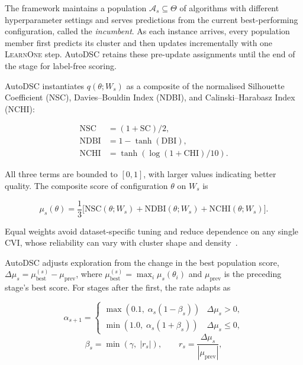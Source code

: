 \documentclass[conference]{IEEEtran}
\begin{document}
The framework maintains a population $\mathcal{A}_s \subseteq \Theta$ of algorithms with different hyperparameter settings and serves predictions from the current best-performing configuration, called the \textit{incumbent}. As each instance arrives, every population member first predicts its cluster and then updates incrementally with one \textsc{LearnOne} step. AutoDSC retains these pre-update assignments until the end of the stage for label-free scoring.

AutoDSC instantiates $q(\theta;W_s)$ as a composite of the normalised Silhouette Coefficient (NSC), Davies--Bouldin Index (NDBI), and Calinski--Harabasz Index (NCHI):

\begin{equation}
\begin{aligned}
\text{NSC} &= (1+\text{SC})/2, \\
\text{NDBI} &= 1-\tanh(\text{DBI}), \\
\text{NCHI} &= \tanh\!\left(\log(1+\text{CHI})/10\right).
\end{aligned}
\label{eq:normalisation}
\end{equation}

All three terms are bounded to $[0,1]$, with larger values indicating better quality. The composite score of configuration $\theta$ on $W_s$ is

\begin{equation}
\label{eq:score}
\mu_s(\theta) = \frac{1}{3}\bigl[\text{NSC}(\theta;W_s) + \text{NDBI}(\theta;W_s) + \text{NCHI}(\theta;W_s)\bigr].
\end{equation}

Equal weights avoid dataset-specific tuning and reduce dependence on any single CVI, whose reliability can vary with cluster shape and density~\cite{arbelaitz2013extensive,liu2010understanding}.

AutoDSC adjusts exploration from the change in the best population score, $\Delta\mu_s=\mu_{\text{best}}^{(s)}-\mu_{\text{prev}}$, where $\mu_{\text{best}}^{(s)}=\max_i\mu_s(\theta_i)$ and $\mu_{\text{prev}}$ is the preceding stage's best score. For stages after the first, the rate adapts as

\begin{equation}
\alpha_{s+1} = \begin{cases}
\max(0.1,\; \alpha_s(1-\beta_s)) & \Delta\mu_s > 0, \\
\min(1.0,\; \alpha_s(1+\beta_s)) & \Delta\mu_s \leq 0,
\end{cases}
\end{equation}
\begin{equation}
\beta_s = \min(\gamma,\; |r_s|), \qquad
r_s = \frac{\Delta\mu_s}{|\mu_{\text{prev}}|},
\end{equation}
\end{document}
